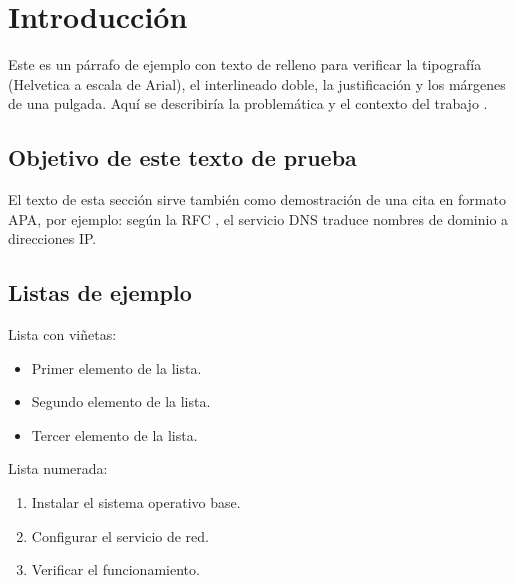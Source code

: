 
\section{Introducción}

Este es un párrafo de ejemplo con texto de relleno para verificar la
tipografía (Helvetica a escala de Arial), el interlineado doble, la
justificación y los márgenes de una pulgada. Aquí se describiría la
problemática y el contexto del trabajo \citep{rfc1035}.

\subsection{Objetivo de este texto de prueba}

El texto de esta sección sirve también como demostración de una cita en
formato APA, por ejemplo: según la RFC \citep{rfc1035}, el servicio DNS
traduce nombres de dominio a direcciones IP.

\subsection{Listas de ejemplo}

Lista con viñetas:

\begin{itemize}
  \item Primer elemento de la lista.
  \item Segundo elemento de la lista.
  \item Tercer elemento de la lista.
\end{itemize}

Lista numerada:

\begin{enumerate}
  \item Instalar el sistema operativo base.
  \item Configurar el servicio de red.
  \item Verificar el funcionamiento.
\end{enumerate}
